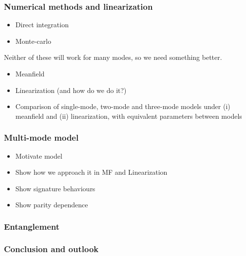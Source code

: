 \documentclass{article}
\begin{document}
\subsubsection*{Numerical methods and linearization}
\begin{itemize}
\item Direct integration
\item Monte-carlo
\end{itemize}
Neither of these will work for many modes, so we need something better.
\begin{itemize}
\item Meanfield
\item Linearization (and how do we do it?)
\item Comparison of single-mode, two-mode and three-mode models under (i) meanfield and (ii) linearization, with equivalent parameters between models
\end{itemize}

\subsubsection*{Multi-mode model}
\begin{itemize}
\item Motivate model
\item Show how we approach it in MF and Linearization
\item Show signature behaviours
\item Show parity dependence 
\end{itemize}

\subsubsection*{Entanglement}

\subsubsection*{Conclusion and outlook}
\end{document}
